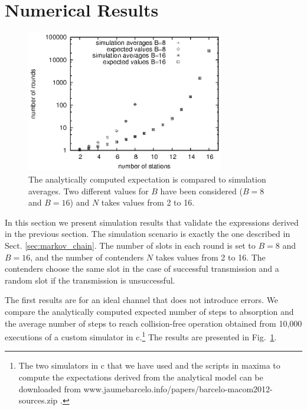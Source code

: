 \documentclass[journal]{IEEEtran}
\begin{document}
\section{Numerical Results}
\label{sec:numerical_results}

\begin{figure}
\centering
\includegraphics[height=6.2cm]{figures/convergence_avg}
\caption{The analytically computed expectation is compared to simulation averages. Two different values for $B$ have been considered ($B=8$ and $B=16$) and $N$ takes values from 2 to 16.}
\label{fig:convergence_avg}
\end{figure}


In this section we present simulation results that validate the expressions derived in the previous section.
The simulation scenario is exactly the one described in Sect. \ref{sec:markov_chain}.
The number of slots in each round is set to $B=8$ and $B=16$, and the number of contenders $N$ takes values from 2 to 16.
The contenders choose the same slot in the case of successful transmission and a random slot if the transmission is unsuccessful.

The first results are for an ideal channel that does not introduce errors.
We compare the analytically computed expected number of steps to absorption and the average number of steps to reach collision-free operation obtained from 10,000 executions of a custom simulator in c.\footnote{The two simulators in c that we have used and the scripts in maxima to compute the expectations derived from the analytical model can be downloaded from www.jaumebarcelo.info/papers/barcelo-macom2012-sources.zip .} 
The results are presented in Fig.~\ref{fig:convergence_avg}.
\end{document}
